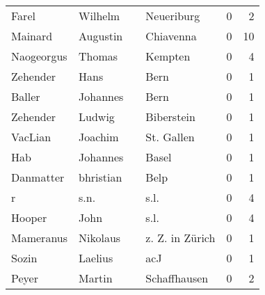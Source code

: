 \begin{tabular}{llllrr}
                    Farel &                            Wilhelm &             &                                  Neueriburg &          0 &         2 \\
                  Mainard &                           Augustin &             &                                   Chiavenna &          0 &        10 \\
               Naogeorgus &                             Thomas &             &                                     Kempten &          0 &         4 \\
                 Zehender &                               Hans &             &                                        Bern &          0 &         1 \\
                   Baller &                           Johannes &             &                                        Bern &          0 &         1 \\
                 Zehender &                             Ludwig &             &                                  Biberstein &          0 &         1 \\
                  VacLian &                            Joachim &             &                                  St. Gallen &          0 &         1 \\
                      Hab &                           Johannes &             &                                       Basel &          0 &         1 \\
                Danmatter &                          bhristian &             &                                        Belp &          0 &         1 \\
                        r &                               s.n. &             &                                        s.l. &          0 &         4 \\
                   Hooper &                               John &             &                                        s.l. &          0 &         4 \\
                Mameranus &                           Nikolaus &             &                             z. Z. in Zürich &          0 &         1 \\
                    Sozin &                            Laelius &             &                                         acJ &          0 &         1 \\
                    Peyer &                             Martin &             &                                Schaffhausen &          0 &         2 \\

\end{tabular}
